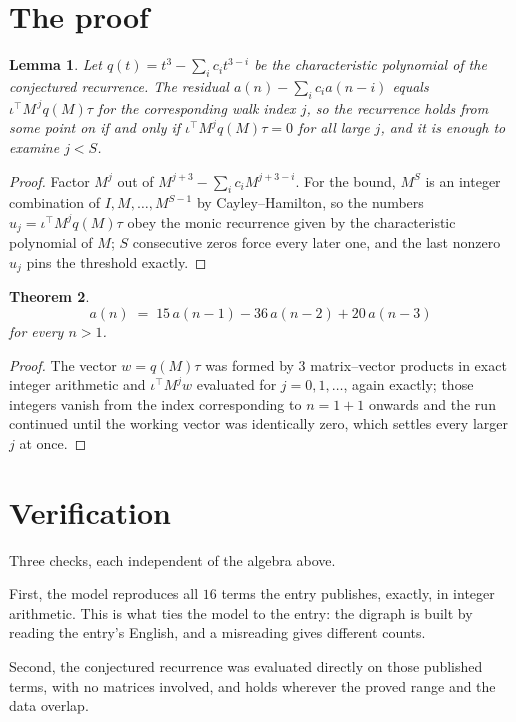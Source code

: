 \documentclass[11pt,a4paper]{article}
\theoremstyle{plain}
\newtheorem{theorem}{Theorem}
\newtheorem{lemma}[theorem]{Lemma}
\theoremstyle{definition}
\begin{document}
\section{The proof}

\begin{lemma}\label{lem:crit}
Let $q(t)=t^{3}-\sum_i c_it^{3-i}$ be the characteristic polynomial of the
conjectured recurrence. The residual $a(n)-\sum_ic_ia(n-i)$ equals
$\iota^{\!\top}M^{\,j}q(M)\tau$ for the corresponding walk index $j$, so the recurrence
holds from some point on if and only if $\iota^{\!\top}M^{j}q(M)\tau=0$ for all large $j$,
and it is enough to examine $j<S$.
\end{lemma}

\begin{proof}
Factor $M^{j}$ out of $M^{j+3}-\sum_ic_iM^{j+3-i}$. For the bound, $M^{S}$
is an integer combination of $I,M,\dots,M^{S-1}$ by Cayley--Hamilton, so the numbers
$u_j=\iota^{\!\top}M^{j}q(M)\tau$ obey the monic recurrence given by the characteristic
polynomial of $M$; $S$ consecutive zeros force every later one, and the last nonzero $u_j$
pins the threshold exactly.
\end{proof}

\begin{theorem}
\[
a(n)\;=\;15\,a(n-1) - 36\,a(n-2) + 20\,a(n-3)
\]
for every $n>1$.
\end{theorem}

\begin{proof}
The vector $w=q(M)\tau$ was formed by $3$ matrix--vector products in exact integer
arithmetic and $\iota^{\!\top}M^{j}w$ evaluated for $j=0,1,\dots$, again exactly; those
integers vanish from the index corresponding to $n=1+1$ onwards and the run continued
until the working vector was identically zero, which settles every larger $j$ at once.
\end{proof}

\section{Verification}

Three checks, each independent of the algebra above.

First, the model reproduces all $16$ terms the entry publishes, exactly, in integer
arithmetic. This is what ties the model to the entry: the digraph is built by reading the
entry's English, and a misreading gives different counts.

Second, the conjectured recurrence was evaluated directly on those published terms, with no
matrices involved, and holds wherever the proved range and the data overlap.
\end{document}

